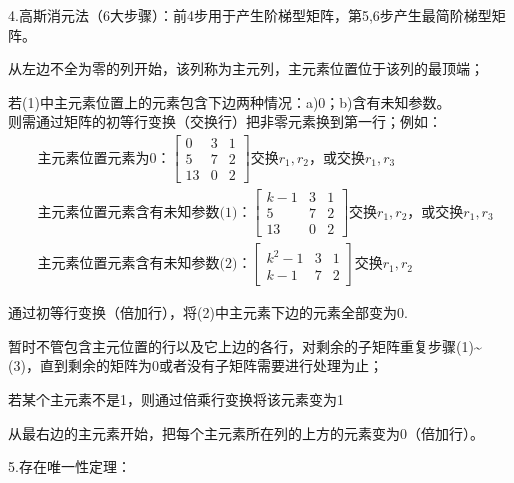 \documentclass{article}
\begin{document}
4.\textcolor[rgb]{1.00,0.00,0.00}{高斯消元法}（6大步骤）：前4步用于产生阶梯型矩阵，第5,6步产生最简阶梯型矩阵。
\begin{asparaenum}[(1)]
\item 从左边不全为零的列开始，该列称为主元列，主元素位置位于该列的最顶端；
\item 若(1)中主元素位置上的元素包含下边两种情况：a)0；b)含有未知参数。\\
    则需通过矩阵的初等行变换（交换行）把非零元素换到第一行；例如：
    \begin{align*}
      &\text{主元素位置元素为0：}
      \begin{bmatrix}
        0 & 3 & 1 \\
        5 & 7 & 2 \\
        13 & 0 & 2
      \end{bmatrix}
      \text{交换$r_{1},r_{2}$，或交换$r_{1},r_{3}$}\\
      &\text{主元素位置元素含有未知参数(1)：}
      \begin{bmatrix}
        k-1 & 3 & 1 \\
        5 & 7 & 2 \\
        13 & 0 & 2
      \end{bmatrix}
      \text{交换$r_{1},r_{2}$，或交换$r_{1},r_{3}$}\\
      &\text{主元素位置元素含有未知参数(2)：}
      \begin{bmatrix}
        k^{2}-1 & 3 & 1 \\
        k-1 & 7 & 2
      \end{bmatrix}
      \text{交换$r_{1},r_{2}$}
    \end{align*}
\item 通过初等行变换（倍加行），将(2)中主元素下边的元素全部变为0.
\item 暂时不管包含主元位置的行以及它上边的各行，对剩余的子矩阵重复步骤(1)\~{}(3)，直到剩余的矩阵为0或者没有子矩阵需要进行处理为止；
\item 若某个主元素不是1，则通过倍乘行变换将该元素变为1
\item  从最右边的主元素开始，把每个主元素所在列的上方的元素变为0（倍加行）。
\end{asparaenum}

5.\textcolor[rgb]{1.00,0.00,0.00}{存在唯一性定理}：

%
%
%
%
%
\end{document}
